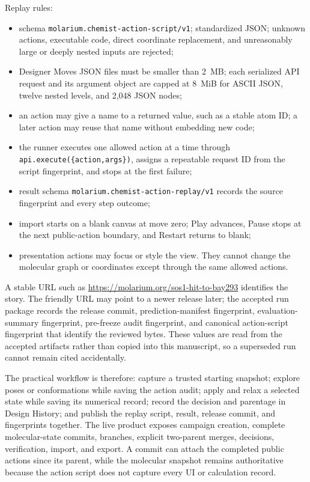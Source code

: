Replay rules:

\begin{itemize}
  \item schema \texttt{molarium.chemist-action-script/v1}; standardized JSON;
    unknown actions, executable code, direct coordinate replacement, and
    unreasonably large or deeply nested inputs are rejected;
  \item Designer Moves JSON files must be smaller than 2~MB; each serialized
    API request and its argument object are capped at 8~MiB for ASCII JSON,
    twelve nested levels, and 2,048 JSON nodes;
  \item an action may give a name to a returned value, such as a stable atom ID;
    a later action may reuse that name without embedding new code;
  \item the runner executes one allowed action at a time through
    \texttt{api.execute(\{action,args\})}, assigns a repeatable request ID from
    the script fingerprint, and stops at the first failure;
  \item result schema \texttt{molarium.chemist-action-replay/v1} records the
    source fingerprint and every step outcome;
  \item import starts on a blank canvas at move zero; Play advances, Pause stops
  at the next public-action boundary, and Restart returns to blank;
  \item presentation actions may focus or style the view. They cannot change the
    molecular graph or coordinates except through the same allowed actions.
\end{itemize}

A stable URL such as \url{https://molarium.org/sos1-hit-to-bay293} identifies the
story. The friendly URL may point to a newer release later; the accepted run
package records the release commit, prediction-manifest fingerprint,
evaluation-summary fingerprint, pre-freeze audit fingerprint, and canonical
action-script fingerprint that identify the reviewed bytes. These values are
read from the accepted artifacts rather than copied into this manuscript, so a
superseded run cannot remain cited accidentally.

The practical workflow is therefore: capture a trusted starting snapshot;
explore poses or conformations while saving the action audit; apply and relax a
selected state while saving its numerical record; record the decision and
parentage in Design History; and publish the replay script, result, release
commit, and fingerprints together. The live product exposes campaign creation,
complete molecular-state commits, branches, explicit two-parent merges,
decisions, verification, import, and export. A commit can attach the completed
public actions since its parent, while the molecular snapshot remains
authoritative because the action script does not capture every UI or calculation
record.

